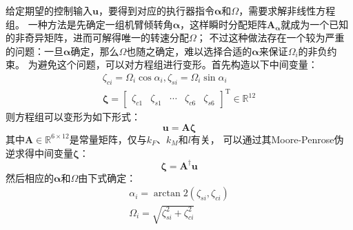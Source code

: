给定期望的控制输入$\bm{u}$，要得到对应的执行器指令$\bm{\alpha}$和$\bm{\varOmega}$，需要求解非线性方程组。
一种方法是先确定一组机臂倾转角$\bm{\alpha}$，这样瞬时分配矩阵$\bm{A}_{\bm{\alpha}}$就成为一个已知的非奇异矩阵，进而可解得唯一的转速分配$\bm{\varOmega}$；
不过这种做法存在一个较为严重的问题：一旦$\bm{\alpha}$确定，那么$\bm{\varOmega}$也随之确定，难以选择合适的$\bm{\alpha}$来保证$\varOmega_i$的非负约束。
为避免这个问题，可以对方程组进行变形。首先构造以下中间变量：
\begin{gather}
    \zeta_{ci} = \varOmega_i\cos\alpha_i, \zeta_{si} = \varOmega_i\sin\alpha_i \\
    \bm{\zeta} = 
    \begin{bmatrix}
        \zeta_{c1} & \zeta_{s1} & \cdots & \zeta_{c6} & \zeta_{s6}
    \end{bmatrix}^{\text{T}} \in \mathbb{R}^{12} \label{equ:new_actuator_command_vector}
\end{gather}
则方程组可以变形为如下形式：
\begin{equation}
    \bm{u} = \bm{A}\bm{\zeta} \label{equ:new_allocation_map}
\end{equation}
其中$\bm{A} \in \mathbb{R}^{6\times12}$是常量矩阵，仅与$k_F$、$k_M$和$l$有关，
可以通过其Moore-Penrose伪逆求得中间变量$\bm{\zeta}$：
\begin{equation}
    \bm{\zeta} = \bm{A}^{\dagger}\bm{u} \label{equ:find_zeta}
\end{equation}
然后相应的$\bm{\alpha}$和$\bm{\varOmega}$由下式确定：
\begin{gather}
    \alpha_i = \arctan2(\zeta_{si}, \zeta_{ci}) \label{equ:alpha_i} \\
    \varOmega_i = \sqrt{\zeta_{si}^2 + \zeta_{ci}^2} \label{equ:Omega_i}
\end{gather}


